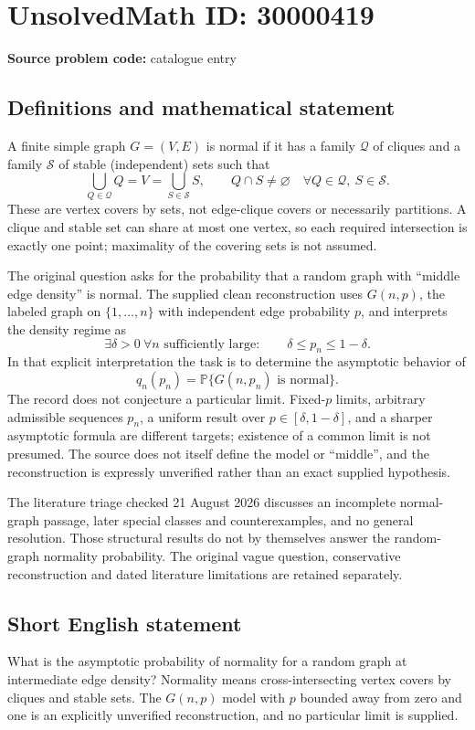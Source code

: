 \documentclass[11pt]{article}
\begin{document}
\section*{UnsolvedMath ID: 30000419}
\textbf{Source problem code:} catalogue entry
\subsection{Definitions and mathematical statement}
A finite simple graph $G=(V,E)$ is normal if it has a family $\mathcal Q$ of cliques and a family $\mathcal S$ of stable (independent) sets such that
\[
 \bigcup_{Q\in\mathcal Q}Q=V=\bigcup_{S\in\mathcal S}S,
 \qquad Q\cap S\ne\varnothing
       \quad\forall Q\in\mathcal Q,\ S\in\mathcal S.
\]
These are vertex covers by sets, not edge-clique covers or necessarily partitions. A clique and stable set can share at most one vertex, so each required intersection is exactly one point; maximality of the covering sets is not assumed.

The original question asks for the probability that a random graph with ``middle edge density'' is normal. The supplied clean reconstruction uses $G(n,p)$, the labeled graph on $\{1,\ldots,n\}$ with independent edge probability $p$, and interprets the density regime as
\[
 \exists\delta>0\ \forall n\text{ sufficiently large}:\qquad
 \delta\leq p_n\leq1-\delta.
\]
In that explicit interpretation the task is to determine the asymptotic behavior of
\[
 q_n(p_n)=\mathbb P\{G(n,p_n)\text{ is normal}\}.
\]
The record does not conjecture a particular limit. Fixed-$p$ limits, arbitrary admissible sequences $p_n$, a uniform result over $p\in[\delta,1-\delta]$, and a sharper asymptotic formula are different targets; existence of a common limit is not presumed. The source does not itself define the model or ``middle'', and the reconstruction is expressly unverified rather than an exact supplied hypothesis.

The literature triage checked 21 August 2026 discusses an incomplete normal-graph passage, later special classes and counterexamples, and no general resolution. Those structural results do not by themselves answer the random-graph normality probability. The original vague question, conservative reconstruction and dated literature limitations are retained separately.
\subsection{Short English statement}
What is the asymptotic probability of normality for a random graph at intermediate edge density? Normality means cross-intersecting vertex covers by cliques and stable sets. The $G(n,p)$ model with $p$ bounded away from zero and one is an explicitly unverified reconstruction, and no particular limit is supplied.
\end{document}
